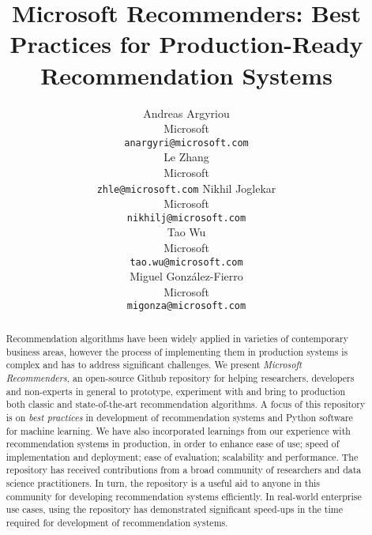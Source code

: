 \documentclass{article}
\title{Microsoft Recommenders: Best Practices for Production-Ready Recommendation Systems}
\author{%
  Andreas Argyriou \\
Microsoft \\ %
  \texttt{anargyri@microsoft.com} \\
\And
  Le Zhang \\
Microsoft \\ %
  \texttt{zhle@microsoft.com} 
\And
  Nikhil Joglekar \\
Microsoft  \\ %
  \texttt{nikhilj@microsoft.com} \\
\And
  Tao Wu \\
Microsoft \\ %
  \texttt{tao.wu@microsoft.com} \\
\And
  Miguel Gonz{\'a}lez-Fierro \\
Microsoft \\ %
  \texttt{migonza@microsoft.com} \\
}
\begin{document}
\maketitle

\begin{abstract}
Recommendation algorithms have been widely applied in varieties of contemporary business areas, however the process of implementing them in production 
systems is complex and has to address significant challenges. We present {\em Microsoft Recommenders},  
an open-source Github repository for helping researchers, developers and non-experts in general to prototype, experiment with and
bring to production both classic and state-of-the-art recommendation algorithms.
A focus of this repository is on {\em best practices} in development of recommendation systems and Python software for machine learning.
We have also incorporated learnings from our experience with recommendation systems in production, in order to enhance ease of use; speed of 
implementation and deployment; ease of evaluation; scalability and performance. 
The repository has received contributions from a broad community of researchers and data science practitioners. 
In turn, the repository is a useful aid to anyone in this community for developing recommendation systems efficiently.
In real-world enterprise use cases, using the repository has demonstrated significant speed-ups in the time required for development of recommendation systems. 
\end{abstract}






%
%
% 
%
%
%














\end{document}

